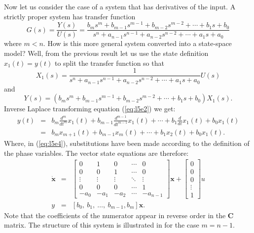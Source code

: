 Now let us consider the case of a system that has derivatives of
the input. A strictly proper system has transfer function
\[G(s)=\frac{Y(s)}{U(s)} = \frac{b_ms^m +
b_{m-1}s^{m-1}+b_{m-2}s^{m-2}+\cdots+b_1s+b_0}{s^n +
a_{n-1}s^{n-1}+a_{n-2}s^{n-2}+\cdots+a_1s+a_0}\] where $m<n$. How
is this more general system converted into a state-space model?
Well, from the previous result let us use the state definition
$x_1(t) = y(t)$ to split the transfer function so that
\begin{equation}\label{eq:l5e1}
X_1(s) = \frac{1}{s^n +
a_{n-1}s^{n-1}+a_{n-2}s^{n-2}+\cdots+a_1s+a_0}U(s)
\end{equation}
and
\begin{equation}\label{eq:l5e2}
Y(s) = \left(b_ms^m +
b_{m-1}s^{m-1}+b_{m-2}s^{m-2}+\cdots+b_1s+b_0\right)X_1(s).\end{equation}
Inverse Laplace transforming equation (\ref{eq:l5e2}) we get:
\begin{eqnarray}\label{eq:l5e3}
y(t) & = & b_m\frac{d^m}{dt^m}x_1(t) +
b_{m-1}\frac{d^{m-1}}{dt^{m-1}}x_1(t)+\cdots+b_1\frac{d}{dt}x_1(t)+
b_0x_1(t)\\ & = & b_mx_{m+1}(t) + b_{m-1}x_m(t)+\cdots+b_1x_2(t)+
b_0x_1(t).\label{eq:l5e4}
\end{eqnarray}
Where, in (\ref{eq:l5e4}), substitutions have been made according
to the definition of the phase variables. The vector state
equations are therefore: \begin{eqnarray*} \dot{\mathbf{x}} &=&
\left[\begin{array}{ccccc}
  0 & 1 & 0 & \cdots & 0 \\
  0 & 0 & 1 & \cdots & 0 \\
  \vdots & \vdots & \vdots & \ddots & \vdots \\
  0 & 0 & 0 & \cdots & 1 \\
  -a_{0} & -a_{1} & -a_{2} & \cdots & -a_{n-1}
\end{array}\right]\mathbf{x}+\left[\begin{array}{c}
  0 \\
  0 \\
  0 \\
  \vdots \\
  1
\end{array}\right]u\\
y & = & [b_0,\ b_1,\ \dots,\ b_{m-1}, b_m]
\mathbf{x}.\end{eqnarray*} Note that the coefficients of the
numerator appear in reverse order in the $\mathbf{C}$ matrix. The
structure of this system is illustrated in  for
the case $m=n-1$.
\begin{slide}\label{slide:l5s4}
\end{slide}


